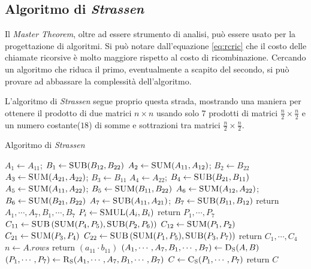 \subsection{Algoritmo di \textit{Strassen}}
Il \textit{Master Theorem}, oltre ad essere strumento di analisi, può essere usato per la progettazione di algoritmi. Si può notare dall'equazione \ref{eq:rcric} che il costo delle chiamate ricorsive è molto maggiore rispetto al costo di ricombinazione. Cercando un algoritmo che riduca il primo, eventualmente a scapito del secondo, si può provare ad abbassare la complessità dell'algoritmo.

L'algoritmo di \textit{Strassen} segue proprio questa strada, mostrando una maniera per ottenere il prodotto di due matrici $n \times n$ usando solo $7$ prodotti di matrici $\frac{n}{2} \times \frac{n}{2}$ e un numero costante($18$) di somme e sottrazioni tra matrici $\frac{n}{2} \times \frac{n}{2}$.

\begin{algorithm}[H]
    \caption{Algoritmo di \textit{Strassen}}\label{alg:strassen}
\begin{algorithmic}[1]
    \State $A_1 \gets A_{11}$; $B_1 \gets \Call{SUB}{B_{12}, B_{22} }$
    \State $A_2 \gets \Call{SUM}{A_{11}, A_{12}}$; $B_2 \gets B_{22}$
    \State $A_3 \gets \Call{SUM}{A_{21}, A_{22}}$; $B_3 \gets B_{11}$
    \State $A_4 \gets A_{22}$; $B_4 \gets \Call{SUB}{B_{21}, B_{11} }$
    \State $A_5 \gets \Call{SUM}{A_{11}, A_{22}}$; $B_5 \gets \Call{SUM}{B_{11}, B_{22} }$
    \State $A_6 \gets \Call{SUM}{A_{12}, A_{22}}$; $B_6 \gets \Call{SUM}{B_{21}, B_{22} }$
    \State $A_7 \gets \Call{SUB}{A_{11}, A_{21}}$; $B_7 \gets \Call{SUB}{B_{11}, B_{12} }$
    \State return $A_1, \cdots, A_7, B_1, \cdots, B_7$
\EndProcedure
{}
    \State $P_i \gets \Call{SMUL}{A_{i}, B_{i} }$
    \EndFor
    \State return $P_1, \cdots, P_7$
\EndProcedure
{}
    \State $C_{11} \gets \Call{SUB}{} \left( \Call{SUM}{P_4, P_5}, \Call{SUB}{P_2, P_6} \right) $
    \State $C_{12} \gets \Call{SUM}{P_1, P_2}$
    \State $C_{21} \gets \Call{SUM}{P_3, P_4}$
    \State $C_{22} \gets \Call{SUB}{} \left( \Call{SUM}{P_1, P_5}, \Call{SUB}{P_3, P_7} \right) $
    \State return $C_1, \cdots, C_4$
\EndProcedure
{}
    \State $n \gets A.rows$
                                 
        \State return $\left( a_{11} \cdot b_{11} \right)$
    \EndIf
    \State $\left( A_1, \cdots, A_7, B_1, \cdots, B_7 \right) \gets \Call{D\textsubscript{S}}{A, B}$
    \State $\left( P_1, \cdots, P_7 \right) \gets \Call{R\textsubscript{S}}{A_1, \cdots, A_7, B_1, \cdots, B_7}$
    \State $C  \gets \Call{C\textsubscript{S}}{P_1, \cdots, P_7}$
    \State return $C$
    \EndProcedure
\end{algorithmic}
\end{algorithm}

